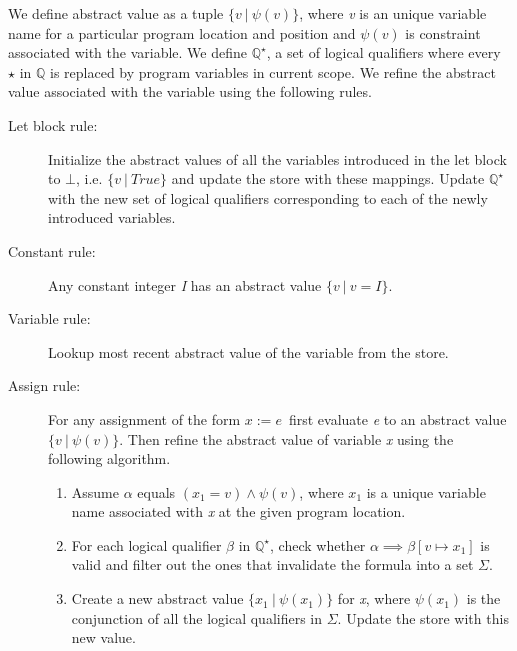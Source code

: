 \documentclass[9pt]{article}
\newcommand{\constr}{\ensuremath{\psi}}
\newcommand{\marketplace}{\ensuremath{\mathbb{Q}^{\star}}}
\begin{document}
We define abstract value as a tuple \ensuremath{\{v\ |\ \constr(v)\}}, where \textit{v} is an unique variable name for a particular program location and position and $\constr(v)$ is constraint associated with the variable. We define \marketplace, a set of logical qualifiers where every \ensuremath{\star} in \ensuremath{\mathbb{Q}} is replaced by program variables in current scope. We refine the abstract value associated with the variable using the following rules.
\begin{description}


\item[Let block rule:]
Initialize the abstract values of all the variables introduced in the let block to \ensuremath{\bot}, i.e. \ensuremath{\{v\ |\ \textit{True}\}} and update the store with these mappings. Update \marketplace with the new set of logical qualifiers corresponding to each of the newly introduced variables.


\item[Constant rule:]
Any constant integer \textit{I} has an abstract value \ensuremath{\{v\ |\ v=I\}}.


\item[Variable rule:]
Lookup most recent abstract value of the variable from the store.


\item[Assign rule:]
For any assignment of the form \ensuremath{x := e}\ first evaluate \textit{e} to an abstract value $\{v\ |\ \constr(v)\}$. Then refine the abstract value of variable \textit{x} using the following algorithm.
\begin{enumerate}
\item
Assume \ensuremath{\alpha} equals $(x_1 = v) \wedge \constr(v)$, where $x_1$ is a unique variable name associated with \textit{x} at the given program location.
\item
For each logical qualifier \ensuremath{\beta} in \marketplace, check whether \ensuremath{\alpha \implies \beta[v\mapsto x_1]} is valid and filter out the ones that invalidate the formula into a set $\Sigma$.
\item
Create a new abstract value $\{x_1\ |\ \constr(x_1)\}$ for \textit{x}, where $\constr(x_1)$ is the conjunction of all the logical qualifiers in $\Sigma$. Update the store with this new value.
\end{enumerate}



\end{description}
\end{document}
